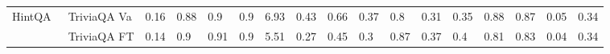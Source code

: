 \begin{table*}[t]
{\begin{tabular}{@{}ll|llll|llll|lll|ll|ll@{}}
\multirow{6}{*}{HintQA~\cite{mozafari-hintqa}}    & TriviaQA Va          & 0.16                                                                    & 0.88                                                                     & 0.9                                                                   & 0.9                                                                   & 6.93                                                                    & 0.43                                                                  & 0.66                                                                  & 0.37                                                                   & 0.8                                                                     & 0.31                                                                  & 0.35                                                                   & 0.88                                                                   & 0.87                                                                   & 0.05                                                                     & 0.34                                                                     \\
                           & TriviaQA FT          & 0.14                                                                    & 0.9                                                                      & 0.91                                                                  & 0.9                                                                   & 5.51                                                                    & 0.27                                                                  & 0.45                                                                  & 0.3                                                                    & 0.87                                                                    & 0.37                                                                  & 0.4                                                                    & 0.81                                                                   & 0.83                                                                   & 0.04                                                                     & 0.34                                                                     \\

\end{tabular}}
\end{table*}
